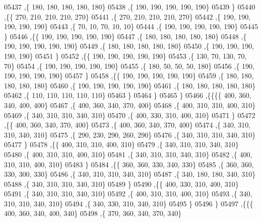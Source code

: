 \begin{DoxyCode}
05437     ,\{   180,   180,   180,   180,   180\}
05438     ,\{   190,   190,   190,   190,   190\}
05439     \}
05440    ,\{\{   270,   210,   210,   210,   270\}
05441     ,\{   270,   210,   210,   210,   270\}
05442     ,\{   190,   190,   190,   190,   190\}
05443     ,\{    70,    10,    70,    10,    10\}
05444     ,\{   190,   190,   190,   190,   190\}
05445     \}
05446    ,\{\{   190,   190,   190,   190,   190\}
05447     ,\{   180,   180,   180,   180,   180\}
05448     ,\{   190,   190,   190,   190,   190\}
05449     ,\{   180,   180,   180,   180,   180\}
05450     ,\{   190,   190,   190,   190,   190\}
05451     \}
05452    ,\{\{   190,   190,   190,   190,   190\}
05453     ,\{   130,    70,   130,    70,    70\}
05454     ,\{   190,   190,   190,   190,   190\}
05455     ,\{   180,    50,    50,    50,   180\}
05456     ,\{   190,   190,   190,   190,   190\}
05457     \}
05458    ,\{\{   190,   190,   190,   190,   190\}
05459     ,\{   180,   180,   180,   180,   180\}
05460     ,\{   190,   190,   190,   190,   190\}
05461     ,\{   180,   180,   180,   180,   180\}
05462     ,\{   110,   110,   110,   110,   110\}
05463     \}
05464    \}
05465   \}
05466  ,\{\{\{\{   400,   360,   340,   400,   400\}
05467     ,\{   400,   360,   340,   370,   400\}
05468     ,\{   400,   310,   310,   400,   310\}
05469     ,\{   340,   310,   310,   340,   310\}
05470     ,\{   400,   330,   310,   400,   310\}
05471     \}
05472    ,\{\{   400,   360,   340,   370,   400\}
05473     ,\{   400,   360,   340,   370,   400\}
05474     ,\{   340,   310,   310,   340,   310\}
05475     ,\{   290,   230,   290,   260,   290\}
05476     ,\{   340,   310,   310,   340,   310\}
05477     \}
05478    ,\{\{   400,   310,   310,   400,   310\}
05479     ,\{   340,   310,   310,   340,   310\}
05480     ,\{   400,   310,   310,   400,   310\}
05481     ,\{   340,   310,   310,   340,   310\}
05482     ,\{   400,   310,   310,   400,   310\}
05483     \}
05484    ,\{\{   360,   360,   330,   340,   330\}
05485     ,\{   360,   360,   330,   300,   330\}
05486     ,\{   340,   310,   310,   340,   310\}
05487     ,\{   340,   180,   180,   340,   310\}
05488     ,\{   340,   310,   310,   340,   310\}
05489     \}
05490    ,\{\{   400,   330,   310,   400,   310\}
05491     ,\{   340,   310,   310,   340,   310\}
05492     ,\{   400,   310,   310,   400,   310\}
05493     ,\{   340,   310,   310,   340,   310\}
05494     ,\{   340,   330,   310,   340,   310\}
05495     \}
05496    \}
05497   ,\{\{\{   400,   360,   340,   400,   340\}
05498     ,\{   370,   360,   340,   370,   340\}

\end{DoxyCode}

